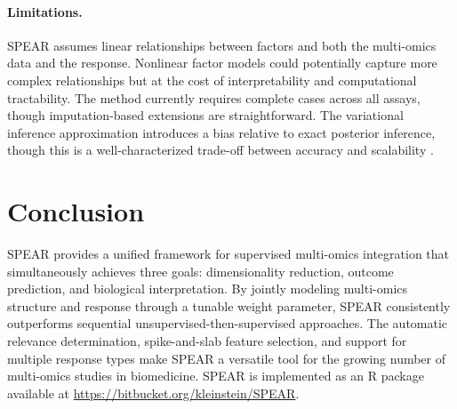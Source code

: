 \documentclass[11pt]{article}
\begin{document}
\paragraph{Limitations.} SPEAR assumes linear relationships between factors and both the multi-omics data and the response. Nonlinear factor models could potentially capture more complex relationships but at the cost of interpretability and computational tractability. The method currently requires complete cases across all assays, though imputation-based extensions are straightforward. The variational inference approximation introduces a bias relative to exact posterior inference, though this is a well-characterized trade-off between accuracy and scalability \citep{blei2017variational}.

\section{Conclusion}

SPEAR provides a unified framework for supervised multi-omics integration that simultaneously achieves three goals: dimensionality reduction, outcome prediction, and biological interpretation. By jointly modeling multi-omics structure and response through a tunable weight parameter, SPEAR consistently outperforms sequential unsupervised-then-supervised approaches. The automatic relevance determination, spike-and-slab feature selection, and support for multiple response types make SPEAR a versatile tool for the growing number of multi-omics studies in biomedicine. SPEAR is implemented as an R package available at \url{https://bitbucket.org/kleinstein/SPEAR}.



\end{document}
